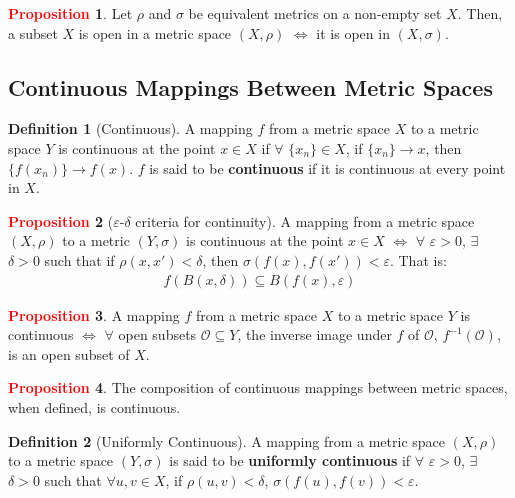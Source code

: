 \documentclass[11pt]{article}
\newcommand{\open}[0]{\mathcal{O}}
\theoremstyle{definition}
\theoremstyle{definition}
\theoremstyle{definition}
\newtheorem{definition}{\textcolor{OliveGreen}{Definition}}
\newtheorem{prop}{\textcolor{red}{Proposition}}
\theoremstyle{remark}
\begin{document}
\begin{prop}
	Let $\rho$ and $\sigma$ be equivalent metrics on a non-empty set $X$. Then, a subset $X$ is open in a metric space $(X, \rho)$ $\iff$ it is open in $(X, \sigma)$. 
\end{prop}
	
\subsection{Continuous Mappings Between Metric Spaces}

\begin{definition}[Continuous]
	A mapping $f$ from a metric space $X$ to a metric space $Y$ is continuous at the point $x \in X$ if $\forall$ $\{ x_n \} \in X$, if $\{ x_n \} \rightarrow x$, then $\{ f(x_n) \} \rightarrow f(x)$. $f$ is said to be \textbf{continuous} if it is continuous at every point in $X$. 
\end{definition}

\begin{prop}[$\varepsilon$-$\delta$ criteria for continuity] 
	A mapping from a metric space $(X, \rho)$ to a metric $(Y, \sigma)$ is continuous at the point $x \in X$ $\iff$ $\forall$ $\varepsilon > 0$, $\exists$ $\delta > 0$ such that if $\rho(x, x') < \delta$, then $\sigma(f(x), f(x')) < \varepsilon$. That is: 
	\begin{align}
		f(B(x, \delta)) \subseteq B(f(x), \varepsilon) 
	\end{align}
\end{prop}

\begin{prop}
	A mapping $f$ from a metric space $X$ to a metric space $Y$ is continuous $\iff$ $\forall$ open subsets $\open \subseteq Y$, the inverse image under $f$ of $\open$, $f^{-1}(\open)$, is an open subset of $X$. 
\end{prop}

\begin{prop}
	The composition of continuous mappings between metric spaces, when defined, is continuous. 
\end{prop}

\begin{definition}[Uniformly Continuous] 
	A mapping from a metric space $(X, \rho)$ to a metric space $(Y, \sigma)$ is said to be \textbf{uniformly continuous} if $\forall$ $\varepsilon > 0$, $\exists$ $\delta > 0$ such that $\forall u, v \in X$, if $\rho(u, v) < \delta$, $\sigma(f(u), f(v)) < \varepsilon$. 
\end{definition}
\end{document}
